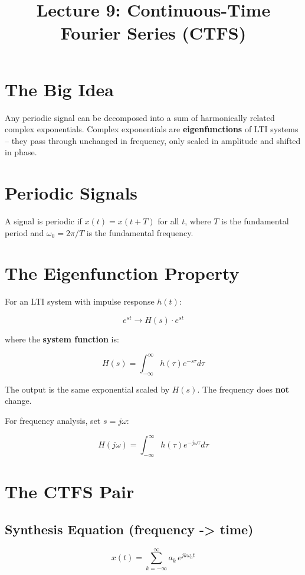 \documentclass[11pt]{article}
\title{Lecture 9: Continuous-Time Fourier Series (CTFS)}
\author{}
\date{}
\begin{document}
\maketitle

\section*{The Big Idea}

Any periodic signal can be decomposed into a sum of harmonically related complex exponentials. Complex exponentials are \textbf{eigenfunctions} of LTI systems -- they pass through unchanged in frequency, only scaled in amplitude and shifted in phase.

\section*{Periodic Signals}

A signal is periodic if $x(t) = x(t + T)$ for all $t$, where $T$ is the fundamental period and $\omega_0 = 2\pi/T$ is the fundamental frequency.

\section*{The Eigenfunction Property}

For an LTI system with impulse response $h(t)$:

\[e^{st} \longrightarrow H(s) \cdot e^{st}\]

where the \textbf{system function} is:

\[H(s) = \int_{-\infty}^{\infty} h(\tau) e^{-s\tau} d\tau\]

The output is the same exponential scaled by $H(s)$. The frequency does \textbf{not} change.

For frequency analysis, set $s = j\omega$:

\[H(j\omega) = \int_{-\infty}^{\infty} h(\tau) e^{-j\omega\tau} d\tau\]

\section*{The CTFS Pair}

\subsection*{Synthesis Equation (frequency -> time)}

\[x(t) = \sum_{k=-\infty}^{\infty} a_k \, e^{jk\omega_0 t}\]
\end{document}
